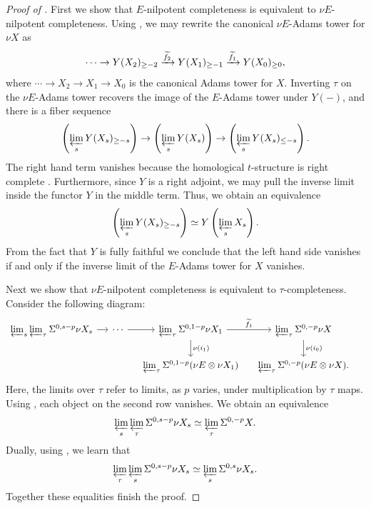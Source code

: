 \begin{proof}[Proof of ]
  First we show that $E$-nilpotent completeness is equivalent to $\nu E$-nilpotent completeness.
  Using \cite[Lemma 4.29 and Proposition 4.35]{Pstragowski}, we may rewrite the canonical $\nu E$-Adams tower for $\nu X$ as
  $$ \cdots \to Y(X_2)_{\geq -2} \xrightarrow{\wt{f_2}} Y(X_1)_{\geq -1} \xrightarrow{\wt{f_1}} Y(X_0)_{\geq 0},$$
	where
	$\cdots \to X_2 \to X_1 \to X_0$
	is the canonical Adams tower for $X$.
  Inverting $\tau$ on the $\nu E$-Adams tower recovers the image of the $E$-Adams tower under $Y(-)$, and there is a fiber sequence
  $$ \left( \varprojlim_s Y(X_s)_{\geq -s} \right) \to \left( \varprojlim_s Y(X_s) \right) \to \left( \varprojlim_s Y(X_s)_{\leq -s} \right). $$
  The right hand term vanishes because the homological $t$-structure is right complete \cite[Proposition 4.16]{Pstragowski}. Furthermore, since $Y$ is a right adjoint, we may pull the inverse limit inside the functor $Y$ in the middle term. Thus, we obtain an equivalence
  $$ \left( \varprojlim_s Y(X_s)_{\geq -s} \right) \simeq Y \left( \varprojlim_s X_s \right).$$
  From the fact that $Y$ is fully faithful we conclude that the left hand side vanishes if and only if the inverse limit of the $E$-Adams tower for $X$ vanishes.
  
  Next we show that $\nu E$-nilpotent completeness is equivalent to $\tau$-completeness. Consider the following diagram:
$$  \begin{tikzcd}[column sep=small]
    \varprojlim_s \varprojlim_\tau \Sigma^{0,s-p} \nu X_s \ar[r] & \cdots \ar[r] &
    \varprojlim_\tau \Sigma^{0,1-p} \nu X_1 \ar[r, "\wt{f_1}"] \ar[d, "\nu(i_1)"] &
    \varprojlim_\tau \Sigma^{0,-p}\nu X \ar[d, "\nu(i_0)"] \\
    & &
    \varprojlim_\tau \Sigma^{0,1-p} (\nu E \otimes \nu X_1) &
    \varprojlim_\tau \Sigma^{0,-p} (\nu E \otimes \nu X). &
			\end{tikzcd} $$
Here, the limits over $\tau$ refer to limits, as $p$ varies, under multiplication by $\tau$ maps.
Using , each object on the second row vanishes. We obtain an equivalence
$$ \varprojlim_s \varprojlim_\tau \Sigma^{0,s-p}\nu X_s \simeq \varprojlim_\tau \Sigma^{0,-p}X. $$
Dually, using , we learn that
$$ \varprojlim_\tau \varprojlim_s \Sigma^{0,s-p}\nu X_s \simeq \varprojlim_s \Sigma^{0,s}\nu X_s. $$
Together these equalities finish the proof.
\end{proof}

